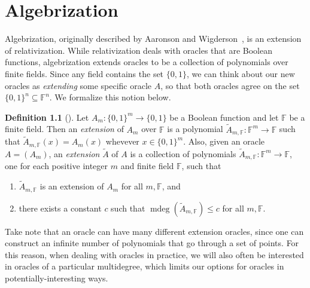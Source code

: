\documentclass[english,12pt]{reedthesis}
\theoremstyle{plain}
\theoremstyle{definition}
\newtheorem{defn}[defn]{Definition}
\theoremstyle{remark}
\DeclareMathOperator{\mdeg}{mdeg}
\begin{document}
\chapter{Algebrization}\label{chap:algebrization}

Algebrization, originally described by Aaronson and Wigderson~\cite{AW09}, is an
extension of relativization. While relativization deals with oracles that are
Boolean functions, algebrization extends oracles to be a collection of
polynomials over finite fields. Since any field contains the set $\{0, 1\}$, we
can think about our new oracles as \emph{extending} some specific oracle $A$, so
that both oracles agree on the set $\{0, 1\}^{n} \subseteq \mathbb{F}^{n}$. We formalize
this notion below.

\begin{defn}[{\cite[Def.\ 2.2]{AW09}}]\label{def:ext-oracle}
  Let $A_{m}: \{0, 1\}^{m} \rightarrow \{0, 1\}$ be a Boolean function and let
  $\mathbb{F}$ be a finite field. Then an \emph{extension} of $A_{m}$ over
  $\mathbb{F}$ is a polynomial
  $\tilde{A}_{m,\mathbb{F}}: \mathbb{F}^{m} \rightarrow \mathbb{F}$ such that
  $\tilde{A}_{m,\mathbb{F}}(x) = A_{m}(x)$ whevever $x \in \{0, 1\}^{m}$. Also,
  given an oracle $A = (A_{m})$, an \emph{extension} $\tilde{A}$ of $A$ is a
  collection of polynomials
  $\tilde{A}_{m,\mathbb{F}}: \mathbb{F}^{m} \rightarrow \mathbb{F}$, one for each positive
  integer $m$ and finite field $\mathbb{F}$, such that
  \begin{enumerate}
    \item $\tilde{A}_{m,\mathbb{F}}$ is an extension of $A_{m}$ for all
          $m,\mathbb{F}$, and
    \item there exists a constant $c$ such that
          $\mdeg(\tilde{A}_{m,\mathbb{F}}) \le c$ for all $m, \mathbb{F}$.
  \end{enumerate}
\end{defn}

Take note that an oracle can have many different extension oracles, since one
can construct an infinite number of polynomials that go through a set of points.
For this reason, when dealing with oracles in practice, we will also often be
interested in oracles of a particular multidegree, which limits our options for
oracles in potentially-interesting ways.
\end{document}

